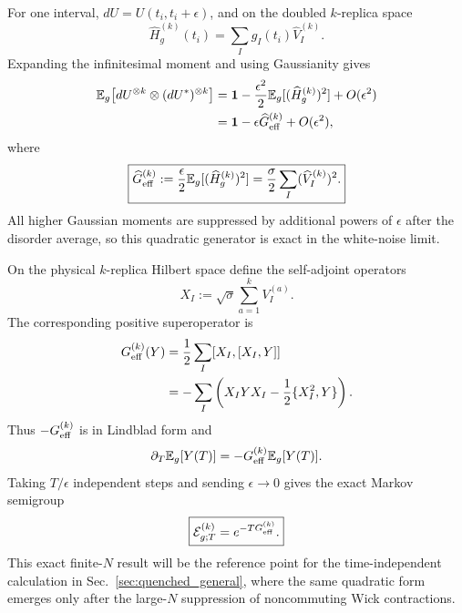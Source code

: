 \documentclass{article}
\theoremstyle{definition}
\begin{document}
For one interval,
$dU=U(t_i,t_i+\epsilon)$, and on the doubled $k$-replica space
\begin{equation}
    \widehat H_g^{(k)}(t_i)
    =\sum_Ig_I(t_i)\widehat V_I^{(k)}.
\end{equation}
Expanding the infinitesimal moment and using Gaussianity gives
\begin{align}
    \mathbb E_g\!\left[dU^{\otimes k}\otimes(dU^*)^{\otimes k}\right]
    &={\bf 1}
      -\frac{\epsilon^2}{2}
       \mathbb E_g[(\widehat H_g^{(k)})^2]
      +O(\epsilon^2)
    \nonumber\\
    &={\bf 1}-\epsilon\widehat G_{\rm eff}^{(k)}+O(\epsilon^2),
\end{align}
where
\begin{equation}
    \boxed{
    \widehat G_{\rm eff}^{(k)}
    :=\frac{\epsilon}{2}
      \mathbb E_g[(\widehat H_g^{(k)})^2]
    =\frac{\sigma}{2}\sum_I(\widehat V_I^{(k)})^2.
    }
    \label{eq:brownian_general_Ghat}
\end{equation}
All higher Gaussian moments are suppressed by additional powers of
$\epsilon$ after the disorder average, so this quadratic generator is exact
in the white-noise limit.

On the physical $k$-replica Hilbert space define the self-adjoint operators
\begin{equation}
    X_I:=\sqrt\sigma\sum_{a=1}^kV_I^{(a)}.
\end{equation}
The corresponding positive superoperator is
\begin{align}
    G_{\rm eff}^{(k)}(Y)
    &=\frac12\sum_I[X_I,[X_I,Y]]
    \nonumber\\
    &=-\sum_I
      \left(X_IYX_I-\frac12\{X_I^2,Y\}\right).
    \label{eq:brownian_general_G}
\end{align}
Thus $-G_{\rm eff}^{(k)}$ is in Lindblad form and
\begin{equation}
    \partial_T\mathbb E_g[Y(T)]
    =-G_{\rm eff}^{(k)}\mathbb E_g[Y(T)].
\end{equation}
Taking $T/\epsilon$ independent steps and sending $\epsilon\to0$ gives the
exact Markov semigroup
\begin{equation}
    \boxed{
    {\cal E}_{g;T}^{(k)}=e^{-TG_{\rm eff}^{(k)}}.
    }
    \label{eq:brownian_general_semigroup}
\end{equation}
This exact finite-$N$ result will be the reference point for the
time-independent calculation in Sec.~\ref{sec:quenched_general}, where the
same quadratic form emerges only after the large-$N$ suppression of
noncommuting Wick contractions.
\end{document}

